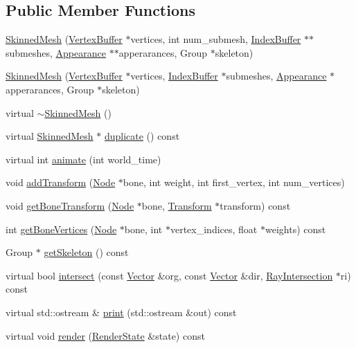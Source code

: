 \subsection*{Public Member Functions}
\begin{CompactItemize}
\item 
\hyperlink{classm3g_1_1SkinnedMesh_277419d6851b0e305f66a46095269915}{SkinnedMesh} (\hyperlink{classm3g_1_1VertexBuffer}{VertexBuffer} $\ast$vertices, int num\_\-submesh, \hyperlink{classm3g_1_1IndexBuffer}{IndexBuffer} $\ast$$\ast$submeshes, \hyperlink{classm3g_1_1Appearance}{Appearance} $\ast$$\ast$apperarances, Group $\ast$skeleton)
\item 
\hyperlink{classm3g_1_1SkinnedMesh_094bf88089897beeb8b8776e3bbb299d}{SkinnedMesh} (\hyperlink{classm3g_1_1VertexBuffer}{VertexBuffer} $\ast$vertices, \hyperlink{classm3g_1_1IndexBuffer}{IndexBuffer} $\ast$submeshes, \hyperlink{classm3g_1_1Appearance}{Appearance} $\ast$apperarances, Group $\ast$skeleton)
\item 
virtual \hyperlink{classm3g_1_1SkinnedMesh_c73da5b5c5f8f14fc241328b4b78928c}{$\sim$SkinnedMesh} ()
\item 
virtual \hyperlink{classm3g_1_1SkinnedMesh}{SkinnedMesh} $\ast$ \hyperlink{classm3g_1_1SkinnedMesh_d3f422cf7656b73687d789094c7eae42}{duplicate} () const 
\item 
virtual int \hyperlink{classm3g_1_1SkinnedMesh_8aad1ceab4c2a03609c8a42324ce484d}{animate} (int world\_\-time)
\item 
void \hyperlink{classm3g_1_1SkinnedMesh_05077c4ee16f87ed4163f4d7a5f4f735}{addTransform} (\hyperlink{classm3g_1_1Node}{Node} $\ast$bone, int weight, int first\_\-vertex, int num\_\-vertices)
\item 
void \hyperlink{classm3g_1_1SkinnedMesh_e6c2fed8109053ded845e49f5c3b0c73}{getBoneTransform} (\hyperlink{classm3g_1_1Node}{Node} $\ast$bone, \hyperlink{classm3g_1_1Transform}{Transform} $\ast$transform) const 
\item 
int \hyperlink{classm3g_1_1SkinnedMesh_84ec0935b92b7ccc0aed7e66c4eac78f}{getBoneVertices} (\hyperlink{classm3g_1_1Node}{Node} $\ast$bone, int $\ast$vertex\_\-indices, float $\ast$weights) const 
\item 
Group $\ast$ \hyperlink{classm3g_1_1SkinnedMesh_ce7d69c2b600f6f01a46214db28e6f92}{getSkeleton} () const 
\item 
virtual bool \hyperlink{classm3g_1_1SkinnedMesh_dc812d8230f94f0b6b8e4fecdb802a16}{intersect} (const \hyperlink{classm3g_1_1Vector}{Vector} \&org, const \hyperlink{classm3g_1_1Vector}{Vector} \&dir, \hyperlink{classm3g_1_1RayIntersection}{RayIntersection} $\ast$ri) const 
\item 
virtual std::ostream \& \hyperlink{classm3g_1_1SkinnedMesh_6fea17fa1532df3794f8cb39cb4f911f}{print} (std::ostream \&out) const 
\item 
virtual void \hyperlink{classm3g_1_1SkinnedMesh_8babc8a79b78615da51161e94029eea9}{render} (\hyperlink{structm3g_1_1RenderState}{RenderState} \&state) const 
\end{CompactItemize}



